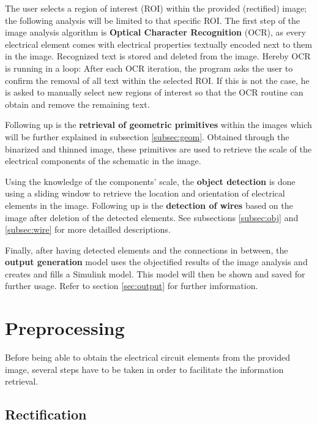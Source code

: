 \documentclass[10pt,twocolumn,letterpaper]{article}
\begin{document}
\par
The user selects a region of interest (ROI) within the provided (rectified) image; the following analysis will be limited to that specific ROI. The first step of the image analysis algorithm is \textbf{Optical Character Recognition} (OCR), as every electrical element comes with electrical properties textually encoded next to them in the image. Recognized text is stored and deleted from the image. Hereby OCR is running in a loop: After each OCR iteration, the program asks the user to confirm the removal of all text within the selected ROI. If this is not the case, he is asked to manually select new regions of interest so that the OCR routine can obtain and remove the remaining text.
\par
Following up is the \textbf{retrieval of geometric primitives} within the images which will be further explained in subsection \ref{subsec:geom}. Obtained through the binarized and thinned image, these primitives are used to retrieve the scale of the electrical components of the schematic in the image.
\par
Using the knowledge of the components' scale, the \textbf{object detection} is done using a sliding window to retrieve the location and orientation of electrical elements in the image. Following up is the \textbf{detection of wires} based on the image after deletion of the detected elements. See subsections \ref{subsec:obj} and \ref{subsec:wire} for more detailled descriptions.
\par
Finally, after having detected elements and the connections in between, the \textbf{output generation} model uses the objectified results of the image analysis and creates and fills a Simulink model. This model will then be shown and saved for further usage. Refer to section \ref{sec:output} for further imformation.


\section{Preprocessing}
\label{sec:pre}

Before being able to obtain the electrical circuit elements from the provided image, several steps have to be taken in order to facilitate the information retrieval.

\subsection{Rectification}
\label{subsec:rect}
\end{document}
